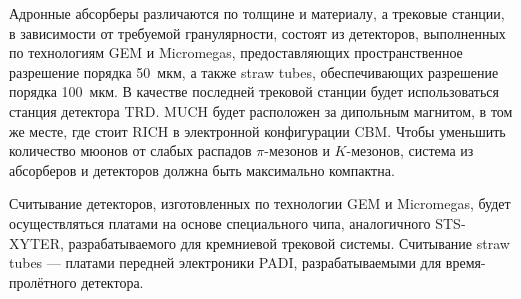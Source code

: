 Адронные абсорберы различаются по толщине и материалу, а трековые станции, в зависимости от требуемой гранулярности, состоят из детекторов, выполненных по технологиям GEM и Micromegas, предоставляющих пространственное разрешение порядка 50~мкм, а также straw tubes, обеспечивающих разрешение порядка 100~мкм. В качестве последней трековой станции будет использоваться станция детектора TRD. MUCH будет расположен за дипольным магнитом, в том же месте, где стоит RICH в электронной конфигурации CBM. Чтобы уменьшить количество мюонов от слабых распадов $\pi$-мезонов и $K$-мезонов, система из абсорберов и детекторов должна быть максимально компактна. %



Считывание детекторов, изготовленных по технологии GEM и Micromegas, будет осуществляться платами на основе специального чипа, аналогичного STS-XYTER, разрабатываемого для кремниевой трековой системы. Считывание straw tubes --- платами передней электроники PADI, разрабатываемыми для время-пролётного детектора.



